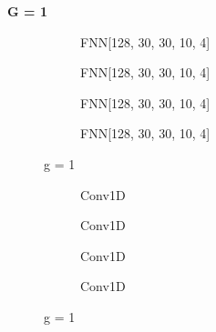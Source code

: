 \documentclass[a4paper,times,12pt]{article}
\begin{document}
\textbf{G = 1}

\begin{figure}[H]
    \centering
    \begin{subfigure}[t]{0.45\textwidth}
		\centering
        
        \caption{FNN[128, 30, 30, 10, 4]}
		\label{fig:a}
    \end{subfigure}\hfill
    \begin{subfigure}[t]{0.45\textwidth}
		\centering
        
        \caption{FNN[128, 30, 30, 10, 4]}
		\label{fig:b}
    \end{subfigure}\hfill    
    \begin{subfigure}[t]{0.45\textwidth}
        \centering
        
        \caption{FNN[128, 30, 30, 10, 4]}
		\label{fig:c}
    \end{subfigure}\hfill
    \begin{subfigure}[t]{0.45\textwidth}
        \centering
        
        \caption{FNN[128, 30, 30, 10, 4]}
		\label{fig:c}
    \end{subfigure}
	\caption{g = 1}
\end{figure}


\begin{figure}[H]
    \centering
    \begin{subfigure}[t]{0.45\textwidth}
		\centering
        
        \caption{Conv1D}
		\label{fig:a}
    \end{subfigure}\hfill
    \begin{subfigure}[t]{0.45\textwidth}
		\centering
        
        \caption{Conv1D}
		\label{fig:b}
    \end{subfigure}\hfill    
    \begin{subfigure}[t]{0.45\textwidth}
        \centering
        
        \caption{Conv1D}
		\label{fig:c}
    \end{subfigure}\hfill
    \begin{subfigure}[t]{0.45\textwidth}
        \centering
        
        \caption{Conv1D}
		\label{fig:c}
    \end{subfigure}
	\caption{g = 1}
\end{figure}
\end{document}
